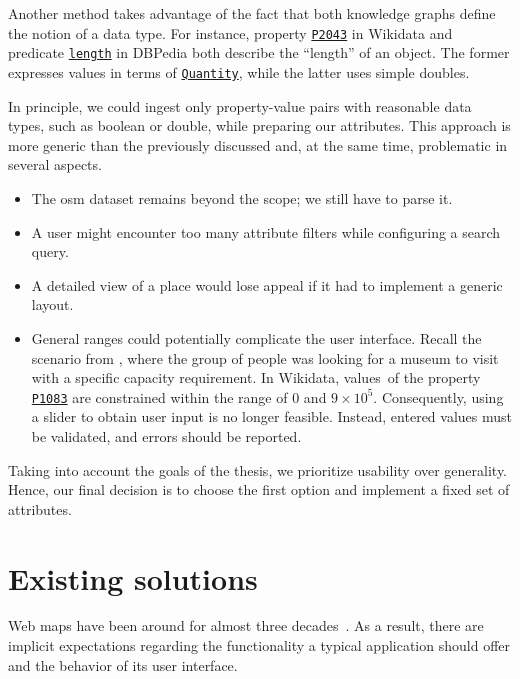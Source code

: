 Another method takes advantage of the fact that both knowledge graphs define the notion of a data type. For instance, property \href{http://www.wikidata.org/prop/direct/P2043}{\texttt{P2043}} in Wikidata and predicate \href{https://dbpedia.org/ontology/length}{\texttt{length}} in DBPedia both describe the ``length'' of an object. The former ex\-press\-es values in terms of \href{https://www.wikidata.org/wiki/Help:Data\_type\#quantity}{\texttt{Quantity}}, while the latter uses simple doubles.

In principle, we could ingest only property-value pairs with reasonable data types, such as boolean or double, while preparing our attributes. This approach is more generic than the previously discussed and, at the same time, problematic in several aspects.

\begin{itemize}
\item The \acs{osm} dataset remains beyond the scope; we still have to parse it.
\item A user might encounter too many attribute filters while configuring a search query.
\item A detailed view of a place would lose appeal if it had to implement a generic layout.
\item General ranges could potentially complicate the user interface. Recall the sce\-nario from \emph{}, where the group of people was looking for a museum to visit with a specific capacity requirement. In Wikidata, values~of the property \href{http://www.wikidata.org/prop/direct/P1083}{\texttt{P1083}} are constrained within the range of $0$ and $9 \times 10^5$. Con\-se\-quent\-ly, using a slider to obtain user input is no longer feasible. Instead, entered values must be validated, and errors should be reported.
\end{itemize}

Taking into account the goals of the thesis, we prioritize usability over generality. Hence, our final decision is to choose the first option and implement a fixed set of attributes.

\section{Existing solutions}\label{sec:existing-solutions}

Web maps have been around for almost three decades~\cite{plewe07}. As a result, there are implicit expectations regarding the functionality a typical application should offer and the behavior of its user interface.

